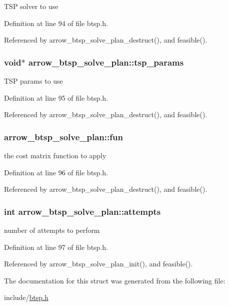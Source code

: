 TSP solver to use 

Definition at line 94 of file btsp.h.

Referenced by arrow\_\-btsp\_\-solve\_\-plan\_\-destruct(), and feasible().\hypertarget{structarrow__btsp__solve__plan_2b7cf65583f45c990218139dbae34ae5}{
\subsubsection{\setlength{\rightskip}{0pt plus 5cm}void$\ast$ {\bf arrow\_\-btsp\_\-solve\_\-plan::tsp\_\-params}}}
\label{structarrow__btsp__solve__plan_2b7cf65583f45c990218139dbae34ae5}


TSP params to use 

Definition at line 95 of file btsp.h.

Referenced by arrow\_\-btsp\_\-solve\_\-plan\_\-destruct(), and feasible().\hypertarget{structarrow__btsp__solve__plan_89fa2ad1bcc026cd50fd7abc6c30ce3e}{
\subsubsection{ {\bf arrow\_\-btsp\_\-solve\_\-plan::fun}}}
\label{structarrow__btsp__solve__plan_89fa2ad1bcc026cd50fd7abc6c30ce3e}


the cost matrix function to apply 

Definition at line 96 of file btsp.h.

Referenced by arrow\_\-btsp\_\-solve\_\-plan\_\-destruct(), and feasible().\hypertarget{structarrow__btsp__solve__plan_acfa3d4257a33548a9f60ee568219bc5}{
\subsubsection{\setlength{\rightskip}{0pt plus 5cm}int {\bf arrow\_\-btsp\_\-solve\_\-plan::attempts}}}
\label{structarrow__btsp__solve__plan_acfa3d4257a33548a9f60ee568219bc5}


number of attempts to perform 

Definition at line 97 of file btsp.h.

Referenced by arrow\_\-btsp\_\-solve\_\-plan\_\-init(), and feasible().

The documentation for this struct was generated from the following file:\begin{CompactItemize}
\item 
include/\hyperlink{btsp_8h}{btsp.h}\end{CompactItemize}
